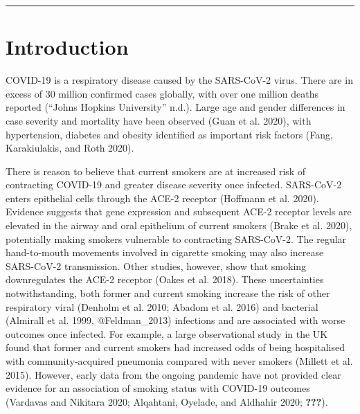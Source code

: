 \documentclass[
]{article}
\begin{document}
\begin{center}\rule{0.5\linewidth}{0.5pt}\end{center}

\hypertarget{introduction}{%
\section{\texorpdfstring{\textbf{Introduction}}{Introduction}}\label{introduction}}

COVID-19 is a respiratory disease caused by the SARS-CoV-2 virus. There
are in excess of 30 million confirmed cases globally, with over one
million deaths reported (``Johns Hopkins University'' n.d.). Large age
and gender differences in case severity and mortality have been observed
(Guan et al. 2020), with hypertension, diabetes and obesity identified
as important risk factors (Fang, Karakiulakis, and Roth 2020).

There is reason to believe that current smokers are at increased risk of
contracting COVID-19 and greater disease severity once infected.
SARS-CoV-2 enters epithelial cells through the ACE-2 receptor (Hoffmann
et al. 2020). Evidence suggests that gene expression and subsequent
ACE-2 receptor levels are elevated in the airway and oral epithelium of
current smokers (Brake et al. 2020), potentially making smokers
vulnerable to contracting SARS-CoV-2. The regular hand-to-mouth
movements involved in cigarette smoking may also increase SARS-CoV-2
transmission. Other studies, however, show that smoking downregulates
the ACE-2 receptor (Oakes et al. 2018). These uncertainties
notwithstanding, both former and current smoking increase the risk of
other respiratory viral (Denholm et al. 2010; Abadom et al. 2016) and
bacterial (Almirall et al. 1999, @Feldman\_2013) infections and are
associated with worse outcomes once infected. For example, a large
observational study in the UK found that former and current smokers had
increased odds of being hospitalised with community-acquired pneumonia
compared with never smokers (Millett et al. 2015). However, early data
from the ongoing pandemic have not provided clear evidence for an
association of smoking status with COVID-19 outcomes (Vardavas and
Nikitara 2020; Alqahtani, Oyelade, and Aldhahir 2020; {\textbf{???}}).
\end{document}
